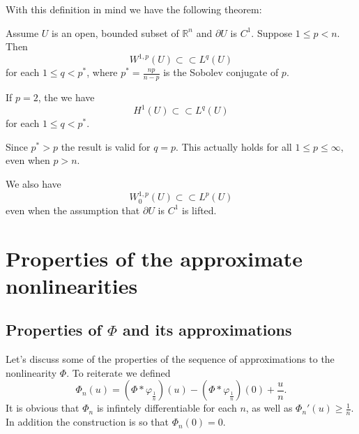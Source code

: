 \documentclass[11pt, a4paper]{article}
\begin{document}
\begin{appendix}
With this definition in mind we have the following theorem:
\begin{theorem}
\label{thm:Rellich}
Assume $U$ is an open, bounded subset of $\mathbb{R}^n$ and $\partial U$ is $C^1$.
Suppose $1\leq p < n$. Then
\begin{equation}
\label{Rellich}
W^{1,p}(U) \subset \subset L^q(U)
\end{equation}
for each $1\leq q < p^*$, where $p^* = \frac{np}{n-p}$ is the Sobolev conjugate of $p$.
\end{theorem}
\setcounter{rem}{0}
\begin{rem}
If $p=2$, the we have
\begin{equation*}
H^1(U) \subset \subset L^q(U)
\end{equation*}
for each $1\leq q < p^*$.
\end{rem}
\begin{rem}
Since $p^* > p$ the result is valid for $q=p$. This actually holds for all $1\leq p \leq \infty$, even when $p > n$.
\end{rem}
\begin{rem}
We also have 
\begin{equation*}
W^{1,p}_0(U) \subset \subset L^p(U)
\end{equation*}
even when the assumption that $\partial U$ is $C^1$ is lifted.
\end{rem}


\newpage
\section{Properties of the approximate nonlinearities}
\subsection{Properties of $\Phi$ and its approximations}
\label{app:Phi}
Let's discuss some of the properties of the sequence of approximations to the nonlinearity $\Phi$. To reiterate we defined
\begin{equation*}
\Phi_n(u) = (\Phi * \varphi_{\frac{1}{n}})(u) - (\Phi * \varphi_{\frac{1}{n}})(0) + \frac{u}{n}.
\end{equation*}
It is obvious that $\Phi_n$ is infintely differentiable for each $n$, as well as $\Phi_n'(u) \geq \frac{1}{n}$. In addition the construction is so that $\Phi_n(0) = 0$.


\end{appendix}
\end{document}

